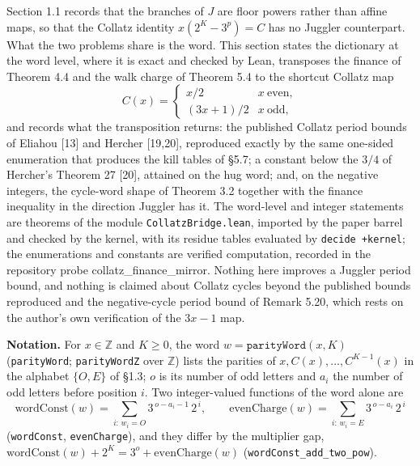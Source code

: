 \documentclass[12pt]{article}
\begin{document}
Section 1.1 records that the branches of \(J\) are floor powers rather
than affine maps, so that the Collatz identity \(x(2^K-3^p)=C\) has no
Juggler counterpart. What the two problems share is the word. This
section states the dictionary at the word level, where it is exact and
checked by Lean, transposes the finance of Theorem 4.4 and the walk
charge of Theorem 5.4 to the shortcut Collatz map \[
C(x)=\begin{cases} x/2 & x\ \text{even},\\ (3x+1)/2 & x\ \text{odd},\end{cases}
\] and records what the transposition returns: the published Collatz
period bounds of Eliahou {[}13{]} and Hercher {[}19,20{]}, reproduced
exactly by the same one-sided enumeration that produces the kill tables
of §5.7; a constant below the \(3/4\) of Hercher's Theorem 27 {[}20{]},
attained on the hug word; and, on the negative integers, the cycle-word
shape of Theorem 3.2 together with the finance inequality in the
direction Juggler has it. The word-level and integer statements are
theorems of the module \texttt{\nolinkurl{CollatzBridge.lean}}, imported
by the paper barrel and checked by the kernel, with its residue tables
evaluated by \texttt{decide\ +kernel}; the enumerations and constants
are verified computation, recorded in the repository probe
collatz\_finance\_mirror. Nothing here improves a Juggler period bound,
and nothing is claimed about Collatz cycles beyond the published bounds
reproduced and the negative-cycle period bound of Remark 5.20, which
rests on the author's own verification of the \(3x-1\) map.

\textbf{Notation.} For \(x\in\mathbb Z\) and \(K\ge 0\), the word
\(w=\mathtt{parityWord}(x,K)\) (\texttt{\nolinkurl{parityWord}};
\texttt{\nolinkurl{parityWordZ}} over \(\mathbb Z\)) lists the parities
of \(x,C(x),\dots,C^{K-1}(x)\) in the alphabet \(\{O,E\}\) of §1.3;
\(o\) is its number of odd letters and \(a_i\) the number of odd letters
before position \(i\). Two integer-valued functions of the word alone
are \[
\mathrm{wordConst}(w)=\sum_{i:\,w_i=O}3^{\,o-a_i-1}\,2^{\,i},\qquad
\mathrm{evenCharge}(w)=\sum_{i:\,w_i=E}3^{\,o-a_i}\,2^{\,i}
\] (\texttt{\nolinkurl{wordConst}}, \texttt{\nolinkurl{evenCharge}}),
and they differ by the multiplier gap,
\(\mathrm{wordConst}(w)+2^K=3^o+\mathrm{evenCharge}(w)\)
(\texttt{\nolinkurl{wordConst_add_two_pow}}).
\end{document}
